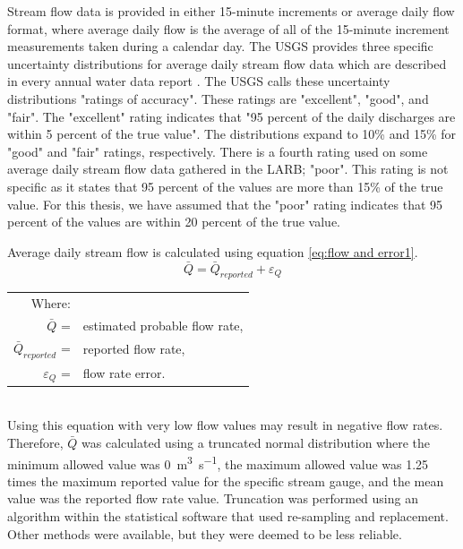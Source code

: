 \begin{linenumbers}
Stream flow data is provided in either 15-minute increments or average daily flow format, where average daily flow is the average of all of the 15-minute increment measurements taken during a calendar day.  The USGS provides three specific uncertainty distributions for average daily stream flow data which are described in every annual water data report \citep{USGS2006NWIS, USGS2007NWIS, USGS2008NWIS, USGS2009NWIS, USGS2010NWIS, USGS2011NWIS, USGS2012NWIS}.  The USGS calls these uncertainty distributions "ratings of accuracy".  These ratings are "excellent", "good", and "fair".  The "excellent" rating indicates that "95 percent of the daily discharges are within 5 percent of the true value".  The distributions expand to 10\% and 15\% for "good" and "fair" ratings, respectively.  There is a fourth rating used on some average daily stream flow data gathered in the LARB; "poor".  This rating is not specific as it states that 95 percent of the values are more than 15\% of the true value.  For this thesis, we have assumed that the "poor" rating indicates that 95 percent of the values are within 20 percent of the true value.

Average daily stream flow is calculated using equation \ref{eq:flow and error1}.   
\begin{equation}
\label{eq:flow and error1}
	\bar{Q}=\bar{Q}_{reported}+\varepsilon_Q
\end{equation}
\begin{tabular}{r l}
Where:&\\
$\bar{Q}$ =& estimated probable flow rate,\\
$\bar{Q}_{reported}$ =& reported flow rate,\\
$\varepsilon_Q$ =& flow rate error.\\
\end{tabular}\\

Using this equation with very low flow values may result in negative flow rates.  Therefore, $\bar{Q}$ was calculated using a truncated normal distribution where the minimum allowed value was \SI{0}{\cubic\meter\per\second}, the maximum allowed value was 1.25 times the maximum reported value for the specific stream gauge, and the mean value was the reported flow rate value.  Truncation was performed using an algorithm within the statistical software that used re-sampling and replacement.  Other methods were available, but they were deemed to be less reliable.


\end{linenumbers}
